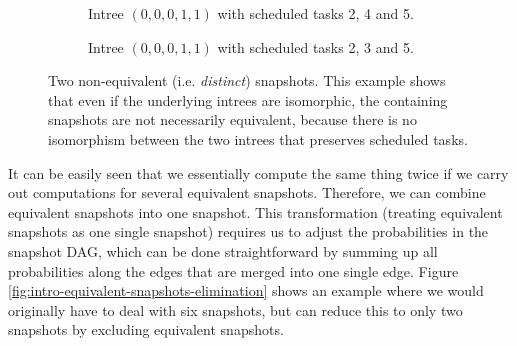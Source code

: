 \begin{figure}
  \centering
  \begin{subfigure}{.45\textwidth}
    \centering
    \caption{Intree $(0,0,0,1,1)$ with scheduled tasks 2, 4 and 5.}
  \end{subfigure}
  \quad
  \begin{subfigure}{.45\textwidth}
    \centering
    \caption{Intree $(0,0,0,1,1)$ with scheduled tasks 2, 3 and 5.}
  \end{subfigure}
  \caption{Two non-equivalent (i.e. \emph{distinct}) snapshots. This example shows that even if the underlying intrees are isomorphic, the containing snapshots are not necessarily equivalent, because there is no isomorphism between the two intrees that preserves scheduled tasks.}
  \label{fig:non-isomorphic-snapshots}
\end{figure}

It can be easily seen that we essentially compute the same thing twice if we carry out computations for several equivalent snapshots. Therefore, we can combine equivalent snapshots into one snapshot. This transformation (treating equivalent snapshots as one single snapshot) requires us to adjust the probabilities in the snapshot DAG, which can be done straightforward by summing up all probabilities along the edges that are merged into one single edge. Figure \ref{fig:intro-equivalent-snapshots-elimination} shows an example where we would originally have to deal with six snapshots, but can reduce this to only two snapshots by excluding equivalent snapshots.

